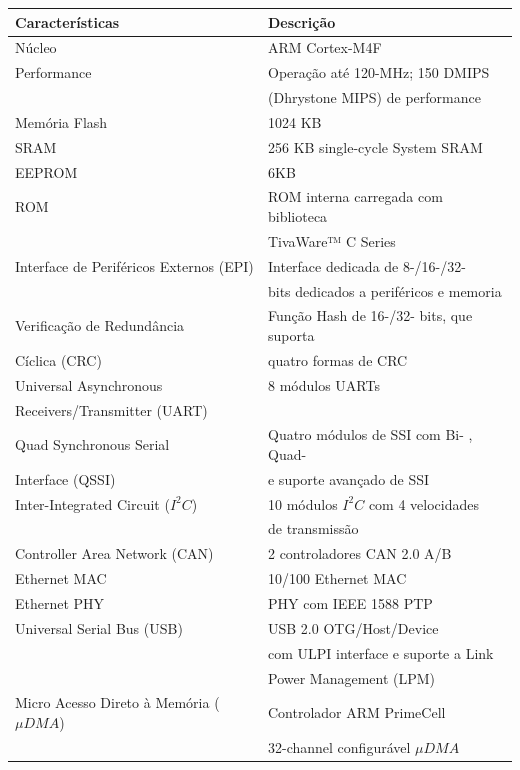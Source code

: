 \begin{longtable}{|l|l|}
	\hline
	\cellcolor[HTML]{343434} \color[HTML]{FFFFFF} Características & \cellcolor[HTML]{343434} \color[HTML]{FFFFFF} Descrição \\
	\hline
	Núcleo & ARM Cortex-M4F\\
	\hline
	Performance & Operação até 120-MHz; 150 DMIPS \\
	& (Dhrystone MIPS) de performance \\
	\hline
	Memória Flash & 1024 KB  \\
	\hline
	SRAM & 256 KB single-cycle System SRAM \\
	\hline
	EEPROM & 6KB  \\
	\hline
	ROM & ROM interna carregada com biblioteca  \\
	 & TivaWare™  C Series \\
	\hline
	Interface de Periféricos Externos (EPI)  & Interface dedicada de 8-/16-/32-   \\ 
	 &  bits dedicados a periféricos e memoria\\
	\hline
	 Verificação de Redundância & Função Hash de 16-/32- bits,  que suporta  \\
	  Cíclica (CRC)   & quatro formas de CRC \\
	\hline
	Universal Asynchronous  & 8 módulos UARTs \\
	Receivers/Transmitter (UART) & \\
	\hline
	Quad Synchronous Serial & Quatro módulos de SSI com Bi- , Quad-\\
	Interface (QSSI) &  e suporte avançado de SSI\\
	\hline
	Inter-Integrated Circuit ($I^{2}C$) & 10 módulos $I^{2}C$ com 4 velocidades \\
	 & de transmissão\\
	\hline
	Controller Area Network (CAN) & 2 controladores CAN 2.0 A/B \\
	\hline
	Ethernet MAC & 10/100 Ethernet MAC \\
	\hline
	Ethernet PHY & PHY com IEEE 1588 PTP \\
	\hline
	Universal Serial Bus (USB) & USB 2.0 OTG/Host/Device  \\ 
	& com ULPI interface e suporte a Link   \\
	& Power Management (LPM) \\
	\hline
	Micro Acesso Direto à Memória ($\mu DMA$) & Controlador ARM PrimeCell  \\
	& 32-channel configurável  $\mu DMA$ \\

\end{longtable}
